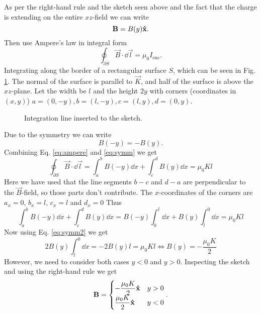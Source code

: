 As per the right-hand rule and the sketch seen above and the fact that the charge is extending on the entire $xz$-field we can write 
\begin{equation}
    \bm{\mathrm{B}} = B(y) \bm{\mathrm{\hat{x}}}.\label{eq:symm}
\end{equation}
Then use Ampere's law in integral form 
\begin{equation}
    \oint_{\partial S} \vec{B} \cdot \dd \vec{l} = \mu_0 I_\text{enc}.\label{eq:ampere}
\end{equation}
Integrating along the border of a rectangular surface $S$, which can be seen in Fig. \ref{fig:ampere}. The normal of the surface is parallel to $\vec{K}$, and half of the surface is above the $xz$-plane. Let the width be $l$ and the height $2y$ with corners (coordinates in $(x,y)$) $a = (0, -y), b=(l,-y), c =(l, y), d=(0, y)$.
\begin{figure}[H]
    \centering
    
    \caption{Integration line inserted to the sketch.}
    \label{fig:ampere}
\end{figure}
Due to the symmetry we can write
\begin{equation}
    B(-y) = -B(y).\label{eq:symm2}
\end{equation}
Combining Eq. \eqref{eq:ampere} and \eqref{eq:symm} we get
\begin{equation}
    \oint_{\partial S} \vec{B} \cdot \dd \vec{l} 
    = \int_{a}^{b} B(-y) \dd x
    +\int_{c}^{d} B(y) \dd x
    = \mu_0 K l
\end{equation}
Here we have used that the line segments $b-c$ and $d-a$ are perpendicular to the $\vec{B}$-field, so those parts don't contribute. The $x$-coordinates of the corners are $a_x = 0$, $b_x = l$, $c_x = l$ and $d_x = 0$ Thus 
\begin{equation}
    \int_{a}^{b} B(-y) \dd x
    +\int_{c}^{d} B(y) \dd x = B(-y) \int_{0}^{l} \dd x + B(y) \int_{l}^{0}\dd x = \mu_0 K l
\end{equation}
Now using Eq. \eqref{eq:symm2} we get
\begin{equation}
    2B(y) \int_{l}^{0} \dd x = -2B(y)l = \mu_0 K l \iff B(y) = -\frac{\mu_0 K}{2}
\end{equation}
However, we need to consider both cases $y < 0$ and $y > 0$. Inspecting the sketch and using the right-hand rule we get
\begin{equation}
    \bm{\mathrm{B}} = \begin{cases}\displaystyle
        -\frac{\mu_0 K}{2}\bm{\mathrm{\hat{x}}} & y > 0\\ \displaystyle
        \frac{\mu_0 K}{2}\bm{\mathrm{\hat{x}}} & y < 0
    \end{cases}.
\end{equation}

